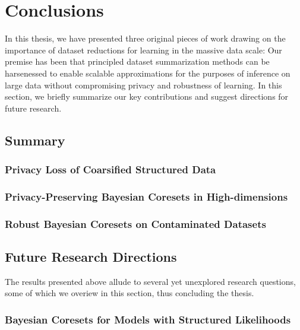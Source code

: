 \chapter{Conclusions}
\label{chap:chap6}
\renewcommand*{\MyPath}{../Chapter6}%

In this thesis, we have presented three original pieces of work drawing on the importance of dataset reductions for learning in the massive data scale: Our premise has been that principled dataset summarization methods can be harsenessed to enable scalable approximations for the purposes of inference on large data without compromising privacy and robustness of learning.
In this section, we briefly summarize our key contributions and suggest directions for future research.

\section{Summary}
\label{sec:summary}

\subsection{Privacy Loss of Coarsified Structured Data}
\label{subsec:ch3-summary}


\subsection{Privacy-Preserving Bayesian Coresets in High-dimensions}
\label{subsec:ch4-summary}

\subsection{Robust Bayesian Coresets on Contaminated Datasets}
\label{subsec:ch4-summary}


\section{Future Research Directions}
\label{sec:future-research-directions}
The results presented above allude to several yet unexplored research questions, some of which we overiew in this section, thus concluding the thesis.

\subsection{Bayesian Coresets for Models with Structured Likelihoods}
\label{subsec:structure-liks}

